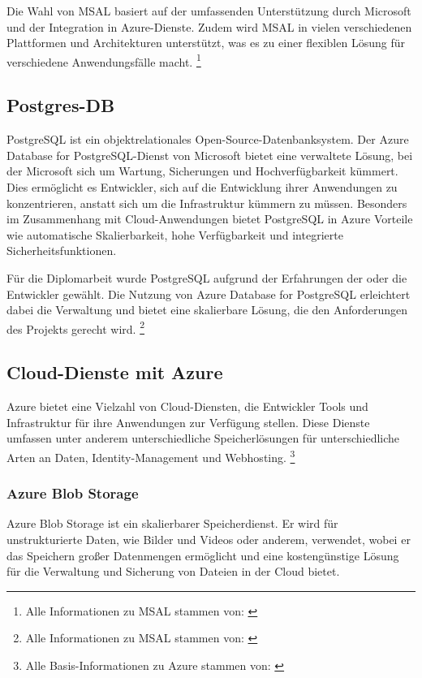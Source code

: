 Die Wahl von MSAL basiert auf der umfassenden Unterstützung durch Microsoft und der 
Integration in Azure-Dienste. Zudem wird MSAL in vielen verschiedenen Plattformen und 
Architekturen unterstützt, was es zu einer flexiblen Lösung für verschiedene Anwendungsfälle 
macht.
\footnote{Alle Informationen zu MSAL stammen von: \cite{MicrosoftCorporationr}}

\subsection{Postgres-DB}
\label{subsection:postgres_db}

PostgreSQL ist ein objektrelationales Open-Source-Datenbanksystem. Der Azure Database for 
PostgreSQL-Dienst von Microsoft bietet eine verwaltete Lösung, bei der Microsoft sich 
um Wartung, Sicherungen und Hochverfügbarkeit kümmert. Dies ermöglicht es Entwickler, 
sich auf die Entwicklung ihrer Anwendungen zu konzentrieren, anstatt sich um die 
Infrastruktur kümmern zu müssen. Besonders im Zusammenhang mit Cloud-Anwendungen 
bietet PostgreSQL in Azure Vorteile wie automatische Skalierbarkeit, hohe Verfügbarkeit 
und integrierte Sicherheitsfunktionen.

Für die Diplomarbeit wurde PostgreSQL aufgrund der Erfahrungen der oder die Entwickler gewählt. 
Die Nutzung von Azure Database for PostgreSQL erleichtert dabei die Verwaltung und 
bietet eine skalierbare Lösung, die den Anforderungen des Projekts gerecht wird.
\footnote{Alle Informationen zu MSAL stammen von: \cite{MicrosoftCorporations}}

\subsection{Cloud-Dienste mit Azure}

Azure bietet eine Vielzahl von Cloud-Diensten, die Entwickler Tools und Infrastruktur 
für ihre Anwendungen zur Verfügung stellen. Diese Dienste umfassen 
unter anderem unterschiedliche Speicherlösungen für unterschiedliche Arten an Daten, 
Identity-Management und Webhosting.
\footnote{Alle Basis-Informationen zu Azure stammen von: \cite{MicrosoftCorporationt}}

\subsubsection{Azure Blob Storage}
\label{subsection:azure_blob_storage}

Azure Blob Storage ist ein skalierbarer Speicherdienst. Er wird für unstrukturierte Daten, 
wie Bilder und Videos oder anderem, verwendet, wobei er das Speichern großer Datenmengen 
ermöglicht und eine kostengünstige Lösung für die Verwaltung und Sicherung von Dateien 
in der Cloud bietet. 

